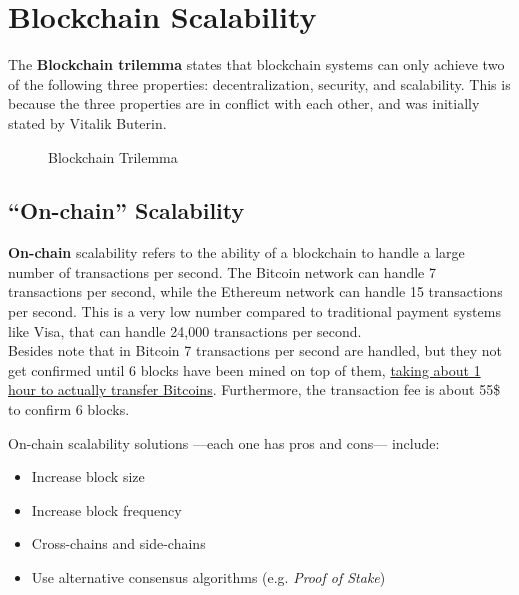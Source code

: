 \chapter{Blockchain Scalability}
The \textbf{Blockchain trilemma} states that blockchain systems can only achieve two of the following three properties: decentralization, security, and scalability. This is because the three properties are in conflict with each other, and was initially stated by Vitalik Buterin.

\begin{figure}[htbp]
   \centering
  \caption{Blockchain Trilemma}
   \label{fig:blockchain_trilemma}
\end{figure}

\section{``On-chain'' Scalability}
\textbf{On-chain} scalability refers to the ability of a blockchain to handle a large number of transactions per second. The Bitcoin network can handle 7 transactions per second, while the Ethereum network can handle 15 transactions per second. This is a very low number compared to traditional payment systems like Visa, that can handle 24,000 transactions per second.\\
Besides note that in Bitcoin 7 transactions per second are handled, but they not get confirmed until 6 blocks have been mined on top of them, \ul{taking about 1 hour to actually transfer Bitcoins}.
Furthermore, the transaction fee is about 55\$ to confirm 6 blocks.

On-chain scalability solutions ---each one has pros and cons--- include:
\begin{itemize}
   \item Increase block size
   \item Increase block frequency
   \item Cross-chains and side-chains 
   \item Use alternative consensus algorithms (e.g. \textit{Proof of Stake})
\end{itemize}

